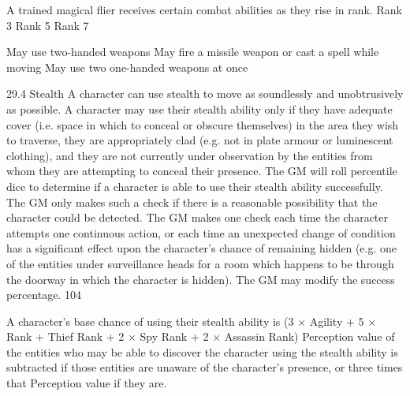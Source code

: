 \documentclass[a4paper]{article}
\begin{document}
\begin{multicols}{3}
A trained magical flier receives certain combat
abilities as they rise in rank.
Rank
3
Rank
5
Rank
7

May use two-handed weapons
May fire a missile weapon or cast a spell
while moving
May use two one-handed weapons at
once

29.4 Stealth
A character can use stealth to move as soundlessly
and unobtrusively as possible.
A character may use their stealth ability only if
they have adequate cover (i.e. space in which to
conceal or obscure themselves) in the area they
wish to traverse, they are appropriately clad (e.g.
not in plate armour or luminescent clothing), and
they are not currently under observation by the
entities from whom they are attempting to conceal
their presence.
The GM will roll percentile dice to determine if a
character is able to use their stealth ability successfully. The GM only makes such a check if there is
a reasonable possibility that the character could be
detected. The GM makes one check each time the
character attempts one continuous action, or each
time an unexpected change of condition has a
significant effect upon the character’s chance of
remaining hidden (e.g. one of the entities under
surveillance heads for a room which happens to be
through the doorway in which the character is
hidden). The GM may modify the success percentage.
104

A character’s base chance of using their stealth
ability is (3 × Agility + 5 × Rank + Thief Rank + 2
× Spy Rank + 2 × Assassin Rank)%
Perception value of the entities who may be able to
discover the character using the stealth ability is
subtracted if those entities are unaware of the character’s presence, or three times that Perception
value if they are.


\end{multicols}
\end{document}

